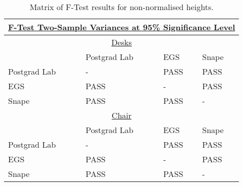 \begin{table}[h!]
	\centering
	\begin{tabular}{p{3cm} p{3cm} p{3cm} p{3cm}}
		\hline
		\multicolumn{4}{c}{\textbf{\underline{F-Test Two-Sample Variances at 95\% Significance Level}}} \\
		\hline
		\multicolumn{4}{c}{\underline{Desks}} \\
		\hline
		\multicolumn{1}{l}{\cellcolor{gray!25}} & \multicolumn{1}{l}{\cellcolor{gray!25} Postgrad Lab } & \multicolumn{1}{l}{\cellcolor{gray!25} EGS } & \multicolumn{1}{l}{\cellcolor{gray!25} Snape}\\
		\cellcolor{gray!25} Postgrad Lab & - & \cellcolor{green!50} PASS & \cellcolor{green!50} PASS \\
		\cellcolor{gray!25} EGS & \cellcolor{green!50} PASS & - & \cellcolor{green!50} PASS \\
		\cellcolor{gray!25} Snape & \cellcolor{green!50} PASS & \cellcolor{green!50} PASS & - \\
		\hline
		\multicolumn{4}{c}{\underline{Chair}} \\
		\hline
		\multicolumn{1}{l}{\cellcolor{gray!25}} & \multicolumn{1}{l}{\cellcolor{gray!25} Postgrad Lab } & \multicolumn{1}{l}{\cellcolor{gray!25} EGS } & \multicolumn{1}{l}{\cellcolor{gray!25} Snape}\\
		\cellcolor{gray!25} Postgrad Lab & - & \cellcolor{green!50} PASS & \cellcolor{green!50} PASS \\
		\cellcolor{gray!25} EGS & \cellcolor{green!50} PASS & - & \cellcolor{green!50} PASS \\
		\cellcolor{gray!25} Snape & \cellcolor{green!50} PASS & \cellcolor{green!50} PASS & - \\
		\hline
	\end{tabular}
	\caption{Matrix of F-Test results for non-normalised heights.}
	\label{matrixNonNormal}
\end{table}


